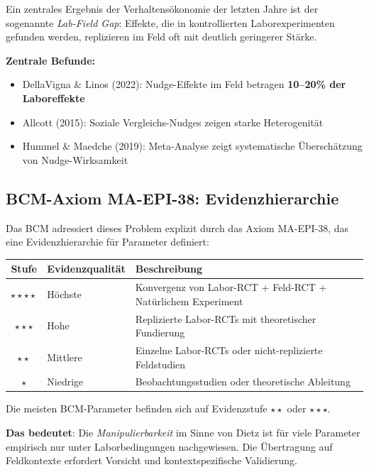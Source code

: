 \documentclass[12pt,a4paper]{article}
\begin{document}
Ein zentrales Ergebnis der Verhaltensökonomie der letzten Jahre ist der sogenannte \textit{Lab-Field Gap}: Effekte, die in kontrollierten Laborexperimenten gefunden werden, replizieren im Feld oft mit deutlich geringerer Stärke.

\textbf{Zentrale Befunde:}
\begin{itemize}
    \item DellaVigna \& Linos (2022): Nudge-Effekte im Feld betragen \textbf{10--20\% der Laboreffekte}
    \item Allcott (2015): Soziale Vergleichs-Nudges zeigen starke Heterogenität
    \item Hummel \& Maedche (2019): Meta-Analyse zeigt systematische Überschätzung von Nudge-Wirksamkeit
\end{itemize}

\subsection{BCM-Axiom MA-EPI-38: Evidenzhierarchie}

Das BCM adressiert dieses Problem explizit durch das Axiom MA-EPI-38, das eine Evidenzhierarchie für Parameter definiert:

\begin{center}
\begin{tabular}{clp{7cm}}
\toprule
\textbf{Stufe} & \textbf{Evidenzqualität} & \textbf{Beschreibung}\\
\midrule
$\star\star\star\star$ & Höchste & Konvergenz von Labor-RCT + Feld-RCT + Natürlichem Experiment\\
$\star\star\star$ & Hohe & Replizierte Labor-RCTs mit theoretischer Fundierung\\
$\star\star$ & Mittlere & Einzelne Labor-RCTs oder nicht-replizierte Feldstudien\\
$\star$ & Niedrige & Beobachtungsstudien oder theoretische Ableitung\\
\bottomrule
\end{tabular}
\end{center}

\begin{tcolorbox}[colback=red!5!white, colframe=red!75!black, title=Implikation für Actionability]
Die meisten BCM-Parameter befinden sich auf Evidenzstufe $\star\star$ oder $\star\star\star$.

\textbf{Das bedeutet}: Die \textit{Manipulierbarkeit} im Sinne von Dietz ist für viele Parameter empirisch nur unter Laborbedingungen nachgewiesen. Die Übertragung auf Feldkontexte erfordert Vorsicht und kontextspezifische Validierung.
\end{tcolorbox}
\end{document}
